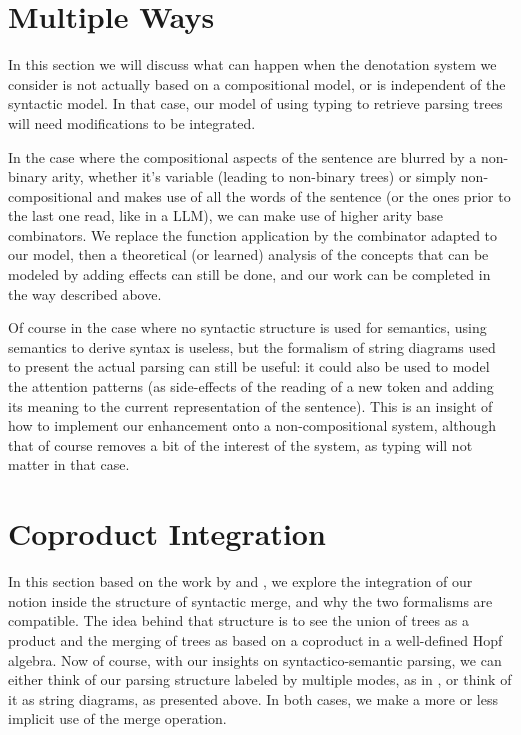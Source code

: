 \section{Multiple Ways}
\label{app:arities-and-denots}
In this section we will discuss what can happen when the denotation system
we consider is not actually based on a compositional model, or is independent
of the syntactic model.
In that case, our model of using typing to retrieve parsing trees will need
modifications to be integrated.

In the case where the compositional aspects of the sentence are blurred by a
non-binary arity, whether it's variable (leading to non-binary trees) or simply
non-compositional and makes use of all the words of the sentence (or the ones
prior to the last one read, like in a LLM), we can make use of higher arity
base combinators.
We replace the function application by the combinator adapted to our model,
then a theoretical (or learned) analysis of the concepts that can be modeled
by adding effects can still be done, and our work can be completed in the way
described above.

Of course in the case where no syntactic structure is used for semantics,
using semantics to derive syntax is useless, but the formalism of string
diagrams used to present the actual parsing can still be useful:
it could also be used to model the attention patterns (as side-effects of the
reading of a new token and adding its meaning to the current representation
of the sentence).
This is an insight of how to implement our enhancement onto a non-compositional
system, although that of course removes a bit of the interest of the system, as
typing will not matter in that case.

\section{Coproduct Integration}
\label{app:coproduct}
In this section based on the work by
\cite{marcollimatildeetchomskynoametberwickrobertc.MathematicalStructureSyntactic}
and \cite{senturiaAlgebraicStructureMorphosyntax2025},
we explore the integration of our notion inside the structure of syntactic
merge, and why the two formalisms are compatible.
The idea behind that structure is to see the union of trees as a product and
the merging of trees as based on a coproduct in a well-defined Hopf algebra.
Now of course, with our insights on syntactico-semantic parsing, we can either
think of our parsing structure labeled by multiple modes, as in
\cite{bumfordEffectdrivenInterpretationFunctors2025}, or think of it as string
diagrams, as presented above.
In both cases, we make a more or less implicit use of the merge operation.

